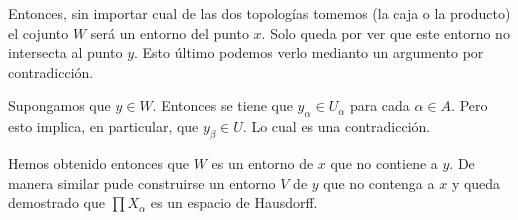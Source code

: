 Entonces, sin importar cual de las dos topologías tomemos (la caja o la producto)
el cojunto $W$ será un entorno del punto $x$. Solo queda por ver que este entorno
no intersecta al punto $y$. Esto último podemos verlo medianto un argumento por
contradicción.

Supongamos que $y\in W$. Entonces se tiene que $y_\alpha\in U_\alpha$ para cada $\alpha\in A$.
Pero esto implica, en particular, que $y_{\beta}\in U$.
Lo cual es una contradicción.

Hemos obtenido entonces que $W$ es un entorno de $x$ que no contiene a $y$.
De manera similar pude construirse un entorno $V$ de $y$ que no contenga a $x$
y queda demostrado que $\prod X_\alpha$ es un espacio de Hausdorff.


